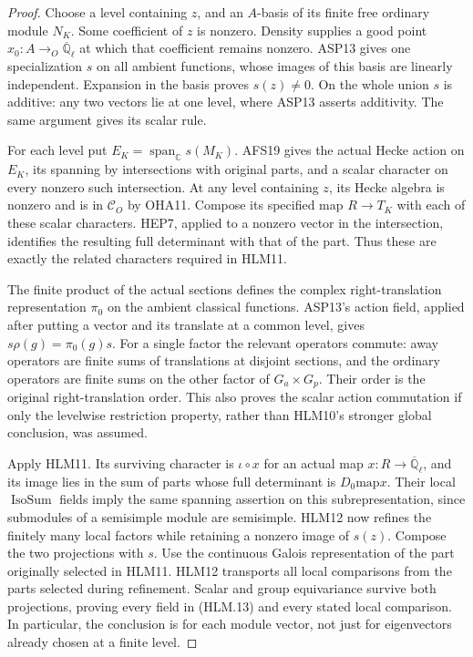 \documentclass[11pt,a4paper]{article}
\numberwithin{equation}{section}
\theoremstyle{remark}\newtheorem{remark}[theorem]{Remark}
\begin{document}
\begin{proof}
Choose a level containing \(z\), and an \(A\)-basis of
its finite free ordinary module \(N_K\).  Some coefficient
of \(z\) is nonzero.  Density supplies a good point
\(x_0:A\to_O\overline{\mathbb Q}_\ell\) at which that
coefficient remains nonzero.  ASP13 gives one specialization
\(s\) on all ambient functions, whose images of this basis
are linearly independent.  Expansion in the basis proves
\(s(z)\ne0\).  On the whole union \(s\) is additive:
any two vectors lie at one level, where ASP13 asserts
additivity.  The same argument gives its scalar rule.

For each level put \(E_K=\operatorname{span}_{\mathbb C}s(M_K)\).
AFS19 gives the actual Hecke action on \(E_K\), its spanning
by intersections with original parts, and a scalar character
on every nonzero such intersection.  At any level containing
\(z\), its Hecke algebra is nonzero and is in \(\mathcal C_O\)
by OHA11.  Compose its specified map \(R\to T_K\) with
each of these scalar characters.  HEP7, applied to a nonzero
vector in the intersection, identifies the resulting full
determinant with that of the part.  Thus these are exactly
the related characters required in HLM11.

The finite product of the actual sections defines the complex
right-translation representation \(\pi_0\) on the ambient
classical functions.  ASP13's action field, applied after
putting a vector and its translate at a common level, gives
\(s\rho(g)=\pi_0(g)s\).  For a single factor the relevant
operators commute: away operators are finite sums of translations
at disjoint sections, and the ordinary operators are finite
sums on the other factor of \(G_a\times G_p\).
Their order is the original right-translation order.  This
also proves the scalar action commutation if only the
levelwise restriction property, rather than HLM10's stronger
global conclusion, was assumed.

Apply HLM11.  Its surviving character is
\(\iota\circ x\) for an actual map \(x:R\to\overline{\mathbb Q}_\ell\),
and its image lies in the sum of parts whose full determinant
is \(D_0\mathbin{\mathrm{map}}x\).  Their local
\(\operatorname{IsoSum}\) fields imply the same spanning
assertion on this subrepresentation, since submodules of a
semisimple module are semisimple.  HLM12 now refines the
finitely many local factors while retaining a nonzero image
of \(s(z)\).  Compose the two projections with \(s\).
Use the continuous Galois representation of the part originally
selected in HLM11.  HLM12 transports all local comparisons
from the parts selected during refinement.  Scalar and group
equivariance survive both projections, proving every field
in (HLM.13) and every stated local comparison.  In particular,
the conclusion is for each module vector, not just for
eigenvectors already chosen at a finite level.
\end{proof}
\end{document}
